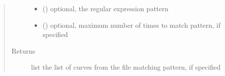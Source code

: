 \documentclass[letterpaper,10pt,english]{sphinxmanual}
\begin{document}
\begin{fulllineitems}
\begin{quote}
\begin{description}
\begin{itemize}
\item {} 
 () \textendash{} optional, the regular expression pattern

\item {} 
 () \textendash{} optional, maximum number of times to match pattern, if specified

\end{itemize}

\item[{Returns}] \leavevmode
list \textendash{} the list of curves from the file matching pattern, if specified

\end{description}\end{quote}

\end{fulllineitems}

\end{document}
